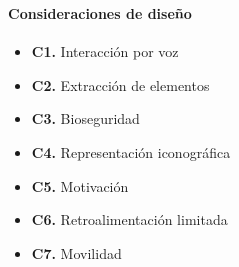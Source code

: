 \begin{frame}
    \frametitle{\pagetitle}
    \framesubtitle{Consideraciones de diseño}
	\begin{itemize}[<+->]
	\item \textbf{C1.} Interacción por voz
	\item \textbf{C2.} Extracción de elementos
	\item \textbf{C3.} Bioseguridad
	\item \textbf{C4.} Representación iconográfica
    \item \textbf{C5.} Motivación
	\item \textbf{C6.} Retroalimentación limitada
	\item \textbf{C7.} Movilidad
	\end{itemize}
\end{frame}

